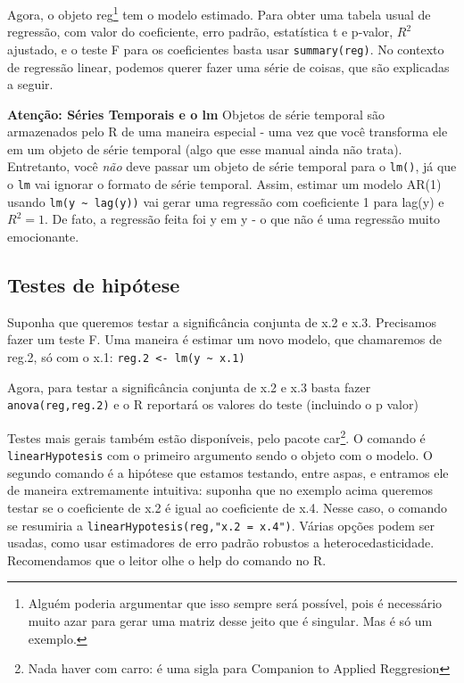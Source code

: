 \documentclass[]{book}
\let\rmarkdownfootnote\footnote%
\def\footnote{\protect\rmarkdownfootnote}
\begin{document}
Agora, o objeto reg\footnote{Alguém poderia argumentar que isso sempre
  será possível, pois é necessário muito azar para gerar uma matriz
  desse jeito que é singular. Mas é só um exemplo.} tem o modelo
estimado. Para obter uma tabela usual de regressão, com valor do
coeficiente, erro padrão, estatística t e p-valor, \(R^2\) ajustado, e o
teste F para os coeficientes basta usar \texttt{summary(reg)}. No
contexto de regressão linear, podemos querer fazer uma série de coisas,
que são explicadas a seguir.

\textbf{Atenção: Séries Temporais e o lm} Objetos de série temporal são
armazenados pelo R de uma maneira especial - uma vez que você transforma
ele em um objeto de série temporal (algo que esse manual ainda não
trata). Entretanto, você \emph{não} deve passar um objeto de série
temporal para o \texttt{lm()}, já que o \texttt{lm} vai ignorar o
formato de série temporal. Assim, estimar um modelo AR(1) usando
\texttt{lm(y\ \textasciitilde{}\ lag(y))} vai gerar uma regressão com
coeficiente 1 para lag(y) e \(R^2 = 1\). De fato, a regressão feita foi
y em y - o que não é uma regressão muito emocionante.

\subsection{Testes de hipótese}\label{testes-de-hipotese}

Suponha que queremos testar a significância conjunta de x.2 e x.3.
Precisamos fazer um teste F. Uma maneira é estimar um novo modelo, que
chamaremos de reg.2, só com o x.1:
\texttt{reg.2\ \textless{}-\ lm(y\ \textasciitilde{}\ x.1)}

Agora, para testar a significância conjunta de x.2 e x.3 basta fazer
\texttt{anova(reg,reg.2)} e o R reportará os valores do teste (incluindo
o p valor)

Testes mais gerais também estão disponíveis, pelo pacote car\footnote{Nada
  haver com carro: é uma sigla para Companion to Applied Reggresion}. O
comando é \texttt{linearHypotesis} com o primeiro argumento sendo o
objeto com o modelo. O segundo comando é a hipótese que estamos
testando, entre aspas, e entramos ele de maneira extremamente intuitiva:
suponha que no exemplo acima queremos testar se o coeficiente de x.2 é
igual ao coeficiente de x.4. Nesse caso, o comando se resumiria a
\texttt{linearHypotesis(reg,"x.2\ =\ x.4")}. Várias opções podem ser
usadas, como usar estimadores de erro padrão robustos a
heterocedasticidade. Recomendamos que o leitor olhe o help do comando no
R.
\end{document}
